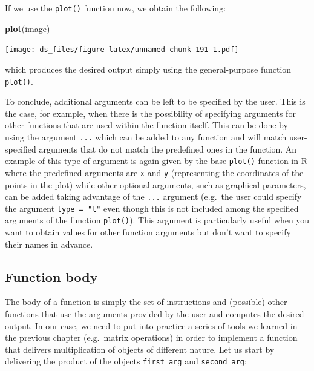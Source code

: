\documentclass[12pt,]{krantz}
\newenvironment{Shaded}{\begin{snugshade}}{\end{snugshade}}
\newcommand{\KeywordTok}[1]{\textcolor[rgb]{0.27,0.27,0.27}{\textbf{#1}}}
\newcommand{\DataTypeTok}[1]{\textcolor[rgb]{0.27,0.27,0.27}{#1}}
\newcommand{\DecValTok}[1]{\textcolor[rgb]{0.06,0.06,0.06}{#1}}
\newcommand{\StringTok}[1]{\textcolor[rgb]{0.5,0.5,0.5}{#1}}
\newcommand{\ControlFlowTok}[1]{\textcolor[rgb]{0.27,0.27,0.27}{\textbf{#1}}}
\newcommand{\OperatorTok}[1]{\textcolor[rgb]{0.43,0.43,0.43}{\textbf{#1}}}
\newcommand{\NormalTok}[1]{#1}
\begin{document}
If we use the \texttt{plot()} function now, we obtain the following:

\begin{Shaded}
\begin{Highlighting}[]
\KeywordTok{plot}\NormalTok{(image)}
\end{Highlighting}
\end{Shaded}

\texttt{[image: ds\_files/figure-latex/unnamed-chunk-191-1.pdf]}

which produces the desired output simply using the general-purpose
function \texttt{plot()}.

To conclude, additional arguments can be left to be specified by the
user. This is the case, for example, when there is the possibility of
specifying arguments for other functions that are used within the
function itself. This can be done by using the argument \texttt{...}
which can be added to any function and will match user-specified
arguments that do not match the predefined ones in the function. An
example of this type of argument is again given by the base
\texttt{plot()} function in R where the predefined arguments are
\texttt{x} and \texttt{y} (representing the coordinates of the points in
the plot) while other optional arguments, such as graphical parameters,
can be added taking advantage of the \texttt{...} argument (e.g.~the
user could specify the argument \texttt{type\ =\ "l"} even though this
is not included among the specified arguments of the function
\texttt{plot()}). This argument is particularly useful when you want to
obtain values for other function arguments but don't want to specify
their names in advance.

\subsection{Function body}\label{function-body}

The body of a function is simply the set of instructions and (possible)
other functions that use the arguments provided by the user and computes
the desired output. In our case, we need to put into practice a series
of tools we learned in the previous chapter (e.g.~matrix operations) in
order to implement a function that delivers multiplication of objects of
different nature. Let us start by delivering the product of the objects
\texttt{first\_arg} and \texttt{second\_arg}:

\begin{Shaded}
\end{Shaded}
\end{document}
